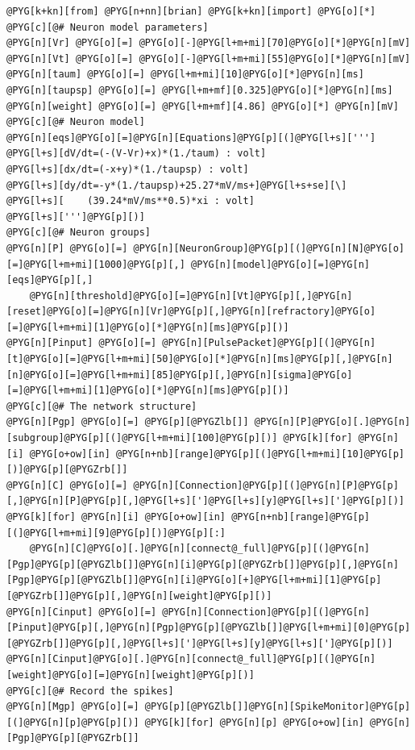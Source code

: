 \documentclass[letterpaper,10pt,english]{manual}
\begin{document}
\begin{Verbatim}[commandchars=@\[\]]
@PYG[k+kn][from] @PYG[n+nn][brian] @PYG[k+kn][import] @PYG[o][*]
@PYG[c][@# Neuron model parameters]
@PYG[n][Vr] @PYG[o][=] @PYG[o][-]@PYG[l+m+mi][70]@PYG[o][*]@PYG[n][mV]
@PYG[n][Vt] @PYG[o][=] @PYG[o][-]@PYG[l+m+mi][55]@PYG[o][*]@PYG[n][mV]
@PYG[n][taum] @PYG[o][=] @PYG[l+m+mi][10]@PYG[o][*]@PYG[n][ms]
@PYG[n][taupsp] @PYG[o][=] @PYG[l+m+mf][0.325]@PYG[o][*]@PYG[n][ms]
@PYG[n][weight] @PYG[o][=] @PYG[l+m+mf][4.86] @PYG[o][*] @PYG[n][mV]
@PYG[c][@# Neuron model]
@PYG[n][eqs]@PYG[o][=]@PYG[n][Equations]@PYG[p][(]@PYG[l+s][''']
@PYG[l+s][dV/dt=(-(V-Vr)+x)*(1./taum) : volt]
@PYG[l+s][dx/dt=(-x+y)*(1./taupsp) : volt]
@PYG[l+s][dy/dt=-y*(1./taupsp)+25.27*mV/ms+]@PYG[l+s+se][\]
@PYG[l+s][    (39.24*mV/ms**0.5)*xi : volt]
@PYG[l+s][''']@PYG[p][)]
@PYG[c][@# Neuron groups]
@PYG[n][P] @PYG[o][=] @PYG[n][NeuronGroup]@PYG[p][(]@PYG[n][N]@PYG[o][=]@PYG[l+m+mi][1000]@PYG[p][,] @PYG[n][model]@PYG[o][=]@PYG[n][eqs]@PYG[p][,]
    @PYG[n][threshold]@PYG[o][=]@PYG[n][Vt]@PYG[p][,]@PYG[n][reset]@PYG[o][=]@PYG[n][Vr]@PYG[p][,]@PYG[n][refractory]@PYG[o][=]@PYG[l+m+mi][1]@PYG[o][*]@PYG[n][ms]@PYG[p][)]
@PYG[n][Pinput] @PYG[o][=] @PYG[n][PulsePacket]@PYG[p][(]@PYG[n][t]@PYG[o][=]@PYG[l+m+mi][50]@PYG[o][*]@PYG[n][ms]@PYG[p][,]@PYG[n][n]@PYG[o][=]@PYG[l+m+mi][85]@PYG[p][,]@PYG[n][sigma]@PYG[o][=]@PYG[l+m+mi][1]@PYG[o][*]@PYG[n][ms]@PYG[p][)]
@PYG[c][@# The network structure]
@PYG[n][Pgp] @PYG[o][=] @PYG[p][@PYGZlb[]] @PYG[n][P]@PYG[o][.]@PYG[n][subgroup]@PYG[p][(]@PYG[l+m+mi][100]@PYG[p][)] @PYG[k][for] @PYG[n][i] @PYG[o+ow][in] @PYG[n+nb][range]@PYG[p][(]@PYG[l+m+mi][10]@PYG[p][)]@PYG[p][@PYGZrb[]]
@PYG[n][C] @PYG[o][=] @PYG[n][Connection]@PYG[p][(]@PYG[n][P]@PYG[p][,]@PYG[n][P]@PYG[p][,]@PYG[l+s][']@PYG[l+s][y]@PYG[l+s][']@PYG[p][)]
@PYG[k][for] @PYG[n][i] @PYG[o+ow][in] @PYG[n+nb][range]@PYG[p][(]@PYG[l+m+mi][9]@PYG[p][)]@PYG[p][:]
    @PYG[n][C]@PYG[o][.]@PYG[n][connect@_full]@PYG[p][(]@PYG[n][Pgp]@PYG[p][@PYGZlb[]]@PYG[n][i]@PYG[p][@PYGZrb[]]@PYG[p][,]@PYG[n][Pgp]@PYG[p][@PYGZlb[]]@PYG[n][i]@PYG[o][+]@PYG[l+m+mi][1]@PYG[p][@PYGZrb[]]@PYG[p][,]@PYG[n][weight]@PYG[p][)]
@PYG[n][Cinput] @PYG[o][=] @PYG[n][Connection]@PYG[p][(]@PYG[n][Pinput]@PYG[p][,]@PYG[n][Pgp]@PYG[p][@PYGZlb[]]@PYG[l+m+mi][0]@PYG[p][@PYGZrb[]]@PYG[p][,]@PYG[l+s][']@PYG[l+s][y]@PYG[l+s][']@PYG[p][)]
@PYG[n][Cinput]@PYG[o][.]@PYG[n][connect@_full]@PYG[p][(]@PYG[n][weight]@PYG[o][=]@PYG[n][weight]@PYG[p][)]
@PYG[c][@# Record the spikes]
@PYG[n][Mgp] @PYG[o][=] @PYG[p][@PYGZlb[]]@PYG[n][SpikeMonitor]@PYG[p][(]@PYG[n][p]@PYG[p][)] @PYG[k][for] @PYG[n][p] @PYG[o+ow][in] @PYG[n][Pgp]@PYG[p][@PYGZrb[]]

\end{Verbatim}
\end{document}
